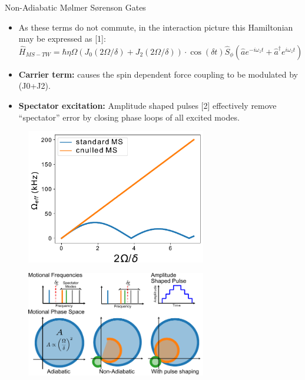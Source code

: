 \documentclass[final]{beamer}
\begin{document}
\begin{frame}{}
\begin{center}
\begin{columns}[t]
\begin{column}{0.49\textwidth}
\begin{alertblock}{Non-Adiabatic Mølmer Sørenson Gates}
      \begin{itemize}
      \item As these terms do not commute, in the interaction picture this Hamiltonian
            may be expressed as [1]:
      \Large$$ \hat{H}_{MS-TW} = \hbar\eta\Omega(J_0(2\Omega/\delta) + J_2(2\Omega/\delta))\cdot \cos{(\delta t)}\hat{S}_{\phi}(\hat{a}e^{-i\omega_zt} + \hat{a}^\dagger e^{i\omega_zt})$$\normalsize
      \end{itemize}
      \begin{minipage}{0.58\textwidth}
      \begin{itemize}
      \item \textbf{Carrier term:} causes the spin dependent force
        coupling to be modulated by (J0+J2).

      \item \textbf{Spectator excitation:} Amplitude shaped pulses
        [2] effectively remove ``spectator'' error by closing
        phase loops of all excited modes.
        
      \end{itemize}
      \end{minipage}
      \begin{minipage}{0.38\textwidth}
      \begin{figure}
        \includegraphics[width=0.7\textwidth]{./figs/J0J2theory.pdf}
      \end{figure}
      \end{minipage}
      \begin{figure}
        \includegraphics[width=0.7\textwidth]{./figs/phase_loops_fig.pdf}
      \end{figure}


\end{alertblock}
\end{column}
\end{columns}
\end{center}
\end{frame}
\end{document}
